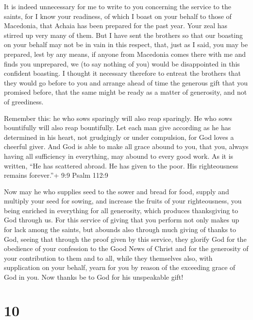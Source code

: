  It is indeed unnecessary for me to write to you concerning
the service to the saints,  for I know your readiness, of
which I boast on your behalf to those of Macedonia, that Achaia has been
prepared for the past year. Your zeal has stirred up very many of them.
 But I have sent the brothers so that our boasting on your
behalf may not be in vain in this respect, that, just as I said, you may
be prepared,  lest by any means, if anyone from Macedonia
comes there with me and finds you unprepared, we (to say nothing of you)
would be disappointed in this confident boasting.  I thought
it necessary therefore to entreat the brothers that they would go before
to you and arrange ahead of time the generous gift that you promised
before, that the same might be ready as a matter of generosity, and not
of greediness.

 Remember this: he who sows sparingly will also reap
sparingly. He who sows bountifully will also reap bountifully.
 Let each man give according as he has determined in his
heart, not grudgingly or under compulsion, for God loves a cheerful
giver.  And God is able to make all grace abound to you,
that you, always having all sufficiency in everything, may abound to
every good work.  As it is written, ``He has scattered
abroad. He has given to the poor. His righteousness remains forever.''+
9:9 Psalm 112:9

 Now may he who supplies seed to the sower and bread for
food, supply and multiply your seed for sowing, and increase the fruits
of your righteousness,  you being enriched in everything
for all generosity, which produces thanksgiving to God through us.
 For this service of giving that you perform not only makes
up for lack among the saints, but abounds also through much giving of
thanks to God,  seeing that through the proof given by this
service, they glorify God for the obedience of your confession to the
Good News of Christ and for the generosity of your contribution to them
and to all,  while they themselves also, with supplication
on your behalf, yearn for you by reason of the exceeding grace of God in
you.  Now thanks be to God for his unspeakable gift!

\hypertarget{section-9}{%
\section{10}\label{section-9}}

